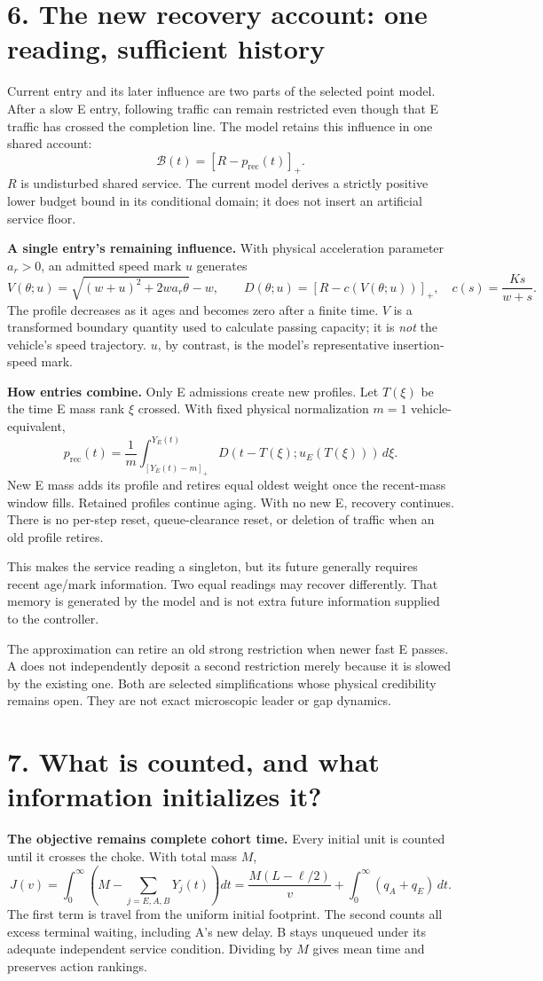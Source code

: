 \documentclass[11pt,a4paper]{article}
\newcommand{\pos}[1]{[#1]_+}
\newcommand{\budget}{\mathcal B}
\newcommand{\loss}{p_{\mathrm{rec}}}
\begin{document}
\newpage
\section*{6. The new recovery account: one reading, sufficient history}
Current entry and its later influence are two parts of the selected point
model. After a slow E entry, following traffic can remain restricted even
though that E traffic has crossed the completion line. The model retains
this influence in one shared account:
\[
 \budget(t)=\pos{R-\loss(t)}.
\]
$R$ is undisturbed shared service. The current model derives a strictly
positive lower budget bound in its conditional domain; it does not insert
an artificial service floor.

\textbf{A single entry's remaining influence.} With physical acceleration
parameter $a_r>0$, an admitted speed mark $u$ generates
\[
 V(\theta;u)=\sqrt{(w+u)^2+2wa_r\theta}-w,\qquad
 D(\theta;u)=\pos{R-c(V(\theta;u))},\quad c(s)=\frac{Ks}{w+s}.
\]
The profile decreases as it ages and becomes zero after a finite time.
$V$ is a transformed boundary quantity used to calculate passing capacity;
it is \emph{not} the vehicle's speed trajectory. $u$, by contrast, is the
model's representative insertion-speed mark.

\textbf{How entries combine.} Only E admissions create new profiles.
Let $T(\xi)$ be the time E mass rank $\xi$ crossed. With fixed physical
normalization $m=1$ vehicle-equivalent,
\[
 \loss(t)=\frac1m\int_{[Y_E(t)-m]_+}^{Y_E(t)}
 D(t-T(\xi);u_E(T(\xi)))\,d\xi.
\]
New E mass adds its profile and retires equal oldest weight once the
recent-mass window fills. Retained profiles continue aging. With no new
E, recovery continues. There is no per-step reset, queue-clearance reset,
or deletion of traffic when an old profile retires.

This makes the service reading a singleton, but its future generally
requires recent age/mark information. Two equal readings may recover
differently. That memory is generated by the model and is not extra future
information supplied to the controller.

The approximation can retire an old strong restriction when newer fast E
passes. A does not independently deposit a second restriction merely
because it is slowed by the existing one. Both are selected simplifications
whose physical credibility remains open. They are not exact microscopic
leader or gap dynamics.

\newpage
\section*{7. What is counted, and what information initializes it?}
\textbf{The objective remains complete cohort time.} Every initial unit
is counted until it crosses the choke. With total mass $M$,
\[
 J(v)=\int_0^\infty\left(M-\sum_{j=E,A,B}Y_j(t)\right)dt
 =\frac{M(L-\ell/2)}v+\int_0^\infty(q_A+q_E)\,dt.
\]
The first term is travel from the uniform initial footprint. The second
counts all excess terminal waiting, including A's new delay. B stays
unqueued under its adequate independent service condition. Dividing by
$M$ gives mean time and preserves action rankings.
\end{document}
